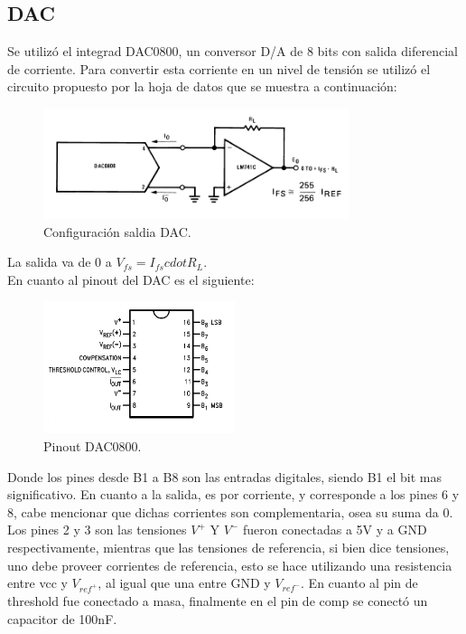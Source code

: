 \subsection{DAC}
Se utilizó el integrad DAC0800, un conversor D/A de 8 bits con salida diferencial de corriente.
Para convertir esta corriente en un nivel de tensión se utilizó el circuito propuesto por la hoja de datos que se muestra a continuación:
\begin{figure}[H]
	\centering
	\includegraphics[width=0.8\textwidth]{ImagenesEjercicio1/dacout.png}
\caption{Configuración saldia DAC.}
	\label{fig:dacout}
\end{figure}
La salida va de 0 a $V_{fs}= I_{fs}cdot R_L$.\\
En cuanto al pinout del DAC es el siguiente:
\begin{figure}[H]
	\centering
	\includegraphics[width=0.5\textwidth]{ImagenesEjercicio1/dacpinout.png}
\caption{Pinout DAC0800.}
	\label{fig:dapinout}
\end{figure}
Donde los pines desde B1 a B8 son las entradas digitales, siendo B1 el bit mas significativo. En cuanto a la salida, es por corriente, y corresponde a los pines 6 y 8, cabe mencionar que dichas corrientes son complementaria, osea su suma da 0. Los pines 2 y 3 son las tensiones $V^+$ Y $V^-$ fueron conectadas a 5V y a GND respectivamente, mientras que las tensiones de referencia, si bien dice tensiones, uno debe proveer corrientes de referencia, esto se hace utilizando una resistencia entre vcc y $V_{ref^+}$, al igual que una entre GND y $V_{ref^-}$. En cuanto al pin de threshold fue conectado a masa, finalmente en el pin de comp se conectó un capacitor de 100nF.

